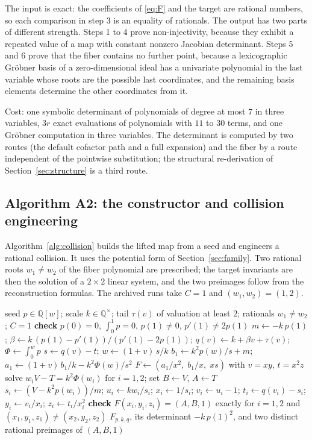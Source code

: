 \documentclass[11pt]{article}
\theoremstyle{definition}
\theoremstyle{remark}
\newcommand{\Q}{\mathbb{Q}}
\begin{document}
The input is exact: the coefficients of \eqref{eq:F} and the target are rational numbers, so each comparison in step 3 is an equality of rationals. The output has two parts of different strength. Steps 1 to 4 prove non-injectivity, because they exhibit a repeated value of a map with constant nonzero Jacobian determinant. Steps 5 and 6 prove that the fiber contains no further point, because a lexicographic Gr\"obner basis of a zero-dimensional ideal has a univariate polynomial in the last variable whose roots are the possible last coordinates, and the remaining basis elements determine the other coordinates from it.

Cost: one symbolic determinant of polynomials of degree at most $7$ in three variables, $3r$ exact evaluations of polynomials with $11$ to $30$ terms, and one Gr\"obner computation
in three variables. The determinant is computed by two routes (the default cofactor path and a full expansion) and the fiber by a route independent of the pointwise
substitution; the structural re-derivation of Section~\ref{sec:structure} is a third route.

\subsection{Algorithm A2: the constructor and collision engineering}

Algorithm~\ref{alg:collision} builds the lifted map from a seed and engineers a rational collision. It uses the potential form of Section~\ref{sec:family}.
Two rational roots $w_1 \ne w_2$ of the fiber polynomial are prescribed; the target invariants are then the solution of a $2\times 2$ linear system, and the two
preimages follow from the reconstruction formulas. The archived runs take $C = 1$ and $(w_1, w_2) = (1, 2)$.

\begin{algorithm}[t]
\caption{Constructor of a Keller map $F_{p,k,q}$ from a seed, and an exact rational collision.}\label{alg:collision}
\begin{algorithmic}[1]
\Require seed $p \in \Q[w]$; scale $k \in \Q^\times$; tail $\tau(v)$ of valuation at least $2$; rationals $w_1 \ne w_2$; $C = 1$
\State \textbf{check} $p(0) = 0$, $\int_0^1 p = 0$, $p(1) \neq 0$, $p'(1) \neq 2p(1)$
\State $m \gets -k\,p(1)$; $\beta \gets k\,(p(1) - p'(1))/(p'(1) - 2p(1))$; $q(v) \gets k + \beta v + \tau(v)$; $\Phi \gets \int_0^w p$
\State $s \gets q(v) - t$; $w \gets (1+v)\,s/k$
\State $b_1 \gets k^2 p(w)/s + m$; $a_1 \gets (1+v)\,b_1/k - k^2\Phi(w)/s^2$ 
\State $F \gets (a_1/x^2,\; b_1/x,\; x s)$ with $v = xy$, $t = x^2 z$
\State solve $w_i V - T = k^2\Phi(w_i)$ for $i = 1,2$; set $B \gets V$, $A \gets T$
 \State $s_i \gets (V - k^2 p(w_i))/m$; $u_i \gets k w_i/s_i$; $x_i \gets 1/s_i$; $v_i \gets u_i - 1$; $t_i \gets q(v_i) - s_i$; $y_i \gets v_i/x_i$; $z_i \gets t_i/x_i^2$
\EndFor
\State \textbf{check} $F(x_i,y_i,z_i) = (A,B,1)$ exactly for $i = 1,2$ and $(x_1,y_1,z_1) \neq (x_2,y_2,z_2)$
\Ensure $F_{p,k,q}$, its determinant $-k\,p(1)^2$, and two distinct rational preimages of $(A,B,1)$
\end{algorithmic}
\end{algorithm}
\end{document}
